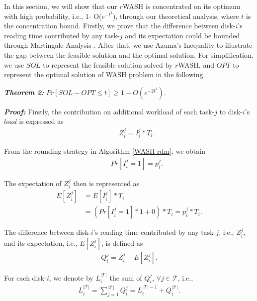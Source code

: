 \documentclass[conference]{IEEEtran}
\begin{document}
In this section, we will show that our $r$WASH is concentrated on its optimum with high probability, i.e., 1- O($e^{-t^2}$), through our theoretical analysis, where $t$ is the concentration bound. Firstly, we prove that the difference between disk-$i$'s reading time contributed by any task-$j$ and its expectation could be bounded through Martingale Analysis \cite{b12}. After that, we use Azuma's Inequality to illustrate the gap between the feasible solution and the optimal solution. For simplification, we use $SOL$ to represent the feasible solution solved by $r$WASH, and $OPT$ to represent the optimal solution of WASH problem in the following.

\vspace{0.2cm}
\emph{\textbf{Theorem 2:}} $Pr[SOL - OPT\leq t] \geq 1 - O(e^{-2t^2})$.

\emph{\textbf{Proof:}} Firstly, the contribution on additional workload of each task-$j$ to disk-$i$'s $load$ is expressed as
\vspace{-0.1cm}
 \begin{align}
&\;\;\;\;\;Z_i^j = I_i^j*T_i.
\end{align}

\vspace{-0.2cm}
From the rounding strategy in Algorithm \ref{WASH-rdm}, we obtain
 \vspace{-0.2cm}
 \begin{align}
&\;\;\;\;\;Pr[I_i^j = 1] = p_i^j. \nonumber
\end{align}

\vspace{-0.2cm}
The expectation of $Z_i^j$ then is represented as
\vspace{-0.2cm}
\begin{align}
E[Z_i^j] &= E[I_i^j]*T_i \nonumber\\
&= (Pr[I_i^j = 1] * 1 +  0)*T_i = p_i^j*T_i.\label{prove:expect}
\end{align}

\vspace{-0.2cm}
The difference between disk-$i$'s reading time contributed by any task-$j$, i.e., $Z_i^j$, and its expectation, i.e., $E[Z_i^j]$, is defined as
 \vspace{-0.1cm}
\begin{align}
Q_i^j = Z_i^j - E[Z_i^j].\label{prove:diff}
\end{align}

\vspace{-0.2cm}
For each disk-$i$, we denote by $L_i^{\mathcal{|T|}}$ the sum of $Q_i^j$, $\forall j \in \mathcal{T}$, i.e., 
 \vspace{-0.1cm}
\begin{align}
L_i^{\mathcal{|T|}} = \sum\nolimits_{j = 1}^{\mathcal{|T|}} Q_i^j
=  L_i^{\mathcal{|T|} - 1} + Q_i^{\mathcal{|T|}}. \label{prove:L_margin}
\end{align}
\end{document}
